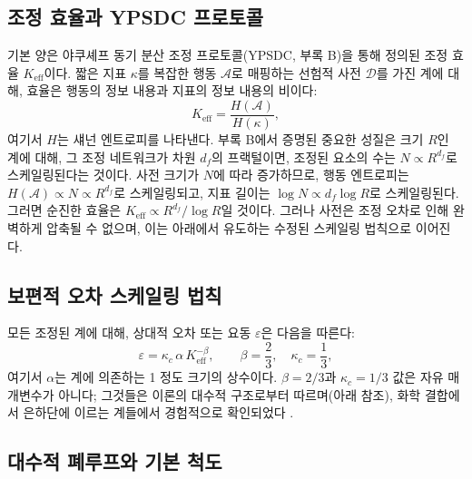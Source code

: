 \documentclass[11pt,a4paper]{article}
\newcommand{\kappac}{\kappa_c}
\newcommand{\Keff}{K_{\mathrm{eff}}}
\newcommand{\betaf}{\beta}
\begin{document}
	\subsection{조정 효율과 YPSDC 프로토콜}
	
	기본 양은 야쿠셰프 동기 분산 조정 프로토콜(YPSDC, 부록 B)을 통해 정의된 조정 효율 \(K_{\mathrm{eff}}\)이다. 짧은 지표 \(\kappa\)를 복잡한 행동 \(\mathcal{A}\)로 매핑하는 선험적 사전 \(\mathcal{D}\)를 가진 계에 대해, 효율은 행동의 정보 내용과 지표의 정보 내용의 비이다:
	\begin{equation}
		\Keff = \frac{H(\mathcal{A})}{H(\kappa)},
		\label{eq:keff-def}
	\end{equation}
	여기서 \(H\)는 섀넌 엔트로피를 나타낸다. 부록 B에서 증명된 중요한 성질은 크기 \(R\)인 계에 대해, 그 조정 네트워크가 차원 \(d_f\)의 프랙털이면, 조정된 요소의 수는 \(N \propto R^{d_f}\)로 스케일링된다는 것이다. 사전 크기가 \(N\)에 따라 증가하므로, 행동 엔트로피는 \(H(\mathcal{A}) \propto N \propto R^{d_f}\)로 스케일링되고, 지표 길이는 \(\log N \propto d_f \log R\)로 스케일링된다. 그러면 순진한 효율은 \(\Keff \propto R^{d_f} / \log R\)일 것이다. 그러나 사전은 조정 오차로 인해 완벽하게 압축될 수 없으며, 이는 아래에서 유도하는 수정된 스케일링 법칙으로 이어진다.
	
	\subsection{보편적 오차 스케일링 법칙}
	
	모든 조정된 계에 대해, 상대적 오차 또는 요동 \(\varepsilon\)은 다음을 따른다:
	\begin{equation}
		\varepsilon = \kappac \, \alpha \, \Keff^{-\betaf}, \qquad \betaf = \frac{2}{3}, \quad \kappac = \frac{1}{3},
		\label{eq:universal}
	\end{equation}
	여기서 \(\alpha\)는 계에 의존하는 1 정도 크기의 상수이다. \(\betaf = 2/3\)과 \(\kappac = 1/3\) 값은 자유 매개변수가 아니다; 그것들은 이론의 대수적 구조로부터 따르며(아래 참조), 화학 결합에서 은하단에 이르는 계들에서 경험적으로 확인되었다 \cite{AppendixL}.
	
	\subsection{대수적 폐루프와 기본 척도}
	
\end{document}
